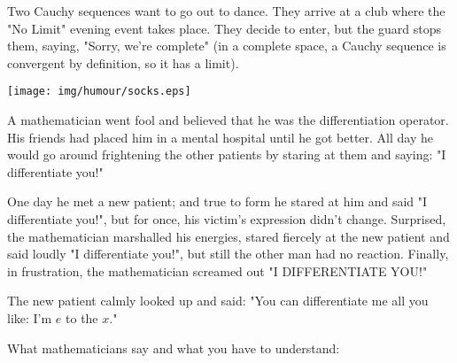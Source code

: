 Two Cauchy sequences want to go out to dance. They arrive at a club where the "No Limit" evening event takes place. They decide to enter, but the guard stops them, saying, "Sorry, we're complete" (in a complete space, a Cauchy sequence is convergent by definition, so it has a limit).	
	\begin{center}\underline{\hspace{5 cm}}\end{center}

	\begin{center}
		\texttt{[image: img/humour/socks.eps]}	
	\end{center}
	\begin{center}\underline{\hspace{5 cm}}\end{center}	

A mathematician went fool and believed that he was the differentiation operator. His friends had placed him in a mental hospital until he got better. All day he would go around frightening the other patients by staring at them and saying: "I differentiate you!" 

One day he met a new patient; and true to form he stared at him and said "I differentiate you!", but for once, his victim's expression didn't change. Surprised, the mathematician marshalled his energies, stared fiercely at the new patient and said loudly "I differentiate you!", but still the other man had no reaction. Finally, in frustration, the mathematician screamed out "I DIFFERENTIATE YOU!"

The new patient calmly looked up and said: "You can differentiate me all you like: I'm $e$ to the $x$."
	\begin{center}\underline{\hspace{5 cm}}\end{center}	

What mathematicians say and what you have to understand:

